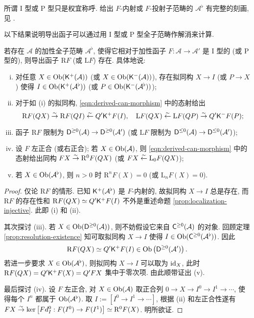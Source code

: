 所谓 I 型或 P 型只是权宜称呼. 给出 $F$-内射或 $F$-投射子范畴的 $\mathcal{A}^\flat$ 有完整的刻画, 见 \cite[Proposition 13.3.5]{KS06}.

以下结果说明导出函子可以通过用 I 型或 P 型全子范畴作解消来计算.

\begin{theorem}\label{prop:derived-via-resolution}
	若存在 $\mathcal{A}$ 的加性全子范畴 $\mathcal{A}^\flat$, 使得它相对于加性函子 $F: \mathcal{A} \to \mathcal{A}'$ 是 I 型的 (或 P 型的), 则导出函子 $\mathrm{R}F$ (或 $\mathrm{L}F$) 存在. 具体地说:
	\begin{enumerate}[(i)]
		\item 对任意 $X \in \operatorname{Ob}(\mathsf{K}^+(\mathcal{A}))$ (或 $X \in \operatorname{Ob}(\mathsf{K}^-(\mathcal{A}))$), 存在拟同构 $X \to I$ (或 $P \to X$) 使得 $I \in \operatorname{Ob}(\mathsf{K}^+(\mathcal{A}^\flat))$ (或 $P \in \operatorname{Ob}(\mathsf{K}^-(\mathcal{A}^\flat))$);
		\item 对于如 (i) 的拟同构, \eqref{eqn:derived-can-morphism} 中的态射给出
		\[ \mathrm{R}F(QX) \stackrel{\sim}{\rightarrow} \mathrm{R}F(QI) \stackrel{\sim}{\leftarrow} Q' \mathsf{K}^+ F(I), \quad \mathrm{L}F(QX) \stackrel{\sim}{\leftarrow} \mathrm{L}F(QP) \stackrel{\sim}{\rightarrow} Q' \mathsf{K}^- F(P); \]
		\item 函子 $\mathrm{R}F$ 限制为 $\mathsf{D}^{\geq 0}(\mathcal{A}) \to \mathsf{D}^{\geq 0}(\mathcal{A}')$ (或 $\mathrm{L}F$ 限制为 $\mathsf{D}^{\leq 0}(\mathcal{A}) \to \mathsf{D}^{\leq 0}(\mathcal{A}')$);
		\item 设 $F$ 左正合 (或右正合); 若 $X \in \operatorname{Ob}(\mathcal{A})$, 则 \eqref{eqn:derived-can-morphism} 中的态射给出同构 $FX \stackrel{\sim}{\rightarrow} \mathrm{R}^0 F(QX)$ (或 $FX \stackrel{\sim}{\leftarrow} \mathrm{L}_0 F(QX)$);
		\item 若 $X \in \operatorname{Ob}(\mathcal{A}^\flat)$, 则 $n > 0$ 时 $\mathrm{R}^n F(X) = 0$ (或 $\mathrm{L}_n F(X) = 0$).
	\end{enumerate}
\end{theorem}
\begin{proof}
	仅论 $\mathrm{R}F$ 的情形. 已知 $\mathsf{K}^+(\mathcal{A}^\flat)$ 是 $F$-内射的, 故拟同构 $X \to I$ 总是存在, 而 $\mathrm{R}F$ 的存在性和 $\mathrm{R}F(QX) \simeq Q' \mathsf{K}^+ F(I)$ 不外是重述命题 \ref{prop:localization-injective}. 此即 (i) 和 (ii).
	
	其次探讨 (iii). 若 $X \in \operatorname{Ob}(\mathsf{D}^{\geq 0}(\mathcal{A}))$, 则不妨假设它来自 $\mathsf{C}^{\geq 0}(\mathcal{A})$ 的对象. 回顾定理 \ref{prop:resolution-existence} 知可取拟同构 $X \to I$ 使得 $I \in \operatorname{Ob}(\mathsf{C}^{\geq 0}(\mathcal{A}^\flat))$. 因此
	\[ \mathrm{R}F(QX) \simeq Q' \mathsf{K}^+ F(I) \in \operatorname{Ob}\left( \mathsf{D}^{\geq 0}(\mathcal{A}')\right). \]
	若进一步要求 $X \in \operatorname{Ob}(\mathcal{A}^\flat)$, 则拟同构 $X \to I$ 可以取为 $\mathrm{id}_X$, 此时 $\mathrm{R}F(QX) = Q' \mathsf{K}^+ F(X) = Q'FX$ 集中于零次项. 由此顺带证出 (v).

	最后探讨 (iv). 设 $F$ 左正合, 对 $X \in \operatorname{Ob}(\mathcal{A})$ 取正合列 $0 \to X \to I^0 \to I^1 \to \cdots$, 使得每个 $I^n$ 都属于 $\operatorname{Ob}(\mathcal{A}^\flat)$. 取 $I := [I^0 \to I^1 \to \cdots]$, 根据 (ii) 和左正合性遂有 $FX \stackrel{\sim}{\rightarrow} \operatorname{ker}\left[ Fd_I^0: F(I^0) \to F(I^1) \right] \simeq \mathrm{R}^0 F(X)$. 明所欲证.
\end{proof}

